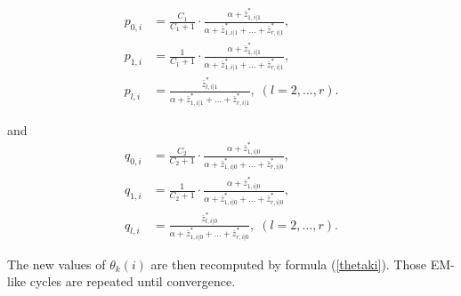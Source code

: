 \documentclass[12pt]{article}
\begin{document}
\begin{appendices}
    \begin{align*}
    p_{0,i} &= \frac{C_1}{C_1+1} \cdot \frac{\alpha+\bar{z}_{1,i|1}^*}
      {\alpha + \bar{z}_{1,i|1}^* +
      \ldots + \bar{z}_{r,i|1}^*}, \\
    p_{1,i} &= \frac{1}{C_1+1} \cdot \frac{\alpha+\bar{z}_{1,i|1}^*}
      {\alpha + \bar{z}_{1,i|1}^* +
      \ldots + \bar{z}_{r,i|1}^*}, \\
    p_{l,i} &= \frac{\bar{z}_{l,i|1}^*}{\alpha + \bar{z}_{1,i|1}^* +
      \ldots + \bar{z}_{r,i|1}^*}, \; (l = 2, \ldots, r).
    \end{align*}

\noindent
    and
    \begin{align*}
    q_{0,i} &= \frac{C_2}{C_2+1} \cdot \frac{\alpha+\bar{z}_{1,i|0}^*}
      {\alpha + \bar{z}_{1,i|0}^* +
      \ldots + \bar{z}_{r,i|0}^*}, \\
    q_{1,i} &= \frac{1}{C_2+1} \cdot \frac{\alpha+\bar{z}_{1,i|0}^*}
      {\alpha + \bar{z}_{1,i|0}^* +
      \ldots + \bar{z}_{r,i|0}^*}, \\
    q_{l,i} &= \frac{\bar{z}_{l,i|0}^*}{\alpha + \bar{z}_{1,i|0}^* +
      \ldots + \bar{z}_{r,i|0}^*}, \; (l = 2, \ldots, r).
    \end{align*}


    The new values of $\theta_k(i)$ are then recomputed by
    formula (\ref{thetaki}). Those EM-like cycles are repeated
    until convergence.

\end{appendices}
\end{document}
